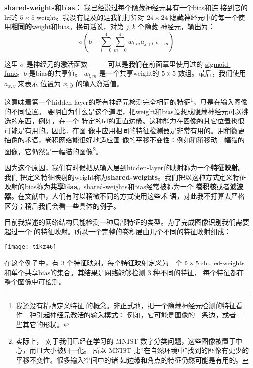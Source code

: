 \textbf{\gls*{shared-weights}和\gls*{bias}：} 我已经说过每个隐藏神经元具有一个\gls*{bias}和连
接到它的\gls*{lrf}的 $5 \times 5$ \gls*{weight}。我没有提及的是我们打算对 $24 \times 24$
隐藏神经元中的每一个使用\textbf{相同的}\gls*{weight}和\gls*{bias}。换句话说，对第 $j, k$ 个隐藏
神经元，输出为：
\begin{equation}
  \sigma\left(b + \sum_{l=0}^4 \sum_{m=0}^4  w_{l,m} a_{j+l, k+m} \right)
  \label{eq:125}\tag{125}
\end{equation}

这里 $\sigma$ 是神经元的激活函数~——~可以是我们在前面章里使用过的
\hyperref[sec:sigmoid_neurons]{\gls*{sigmoid-func}}。$b$ 是\gls*{bias}的共享值。
  $w_{l,m}$ 是一个共享\gls*{weight}的 $5 \times 5$ 数组。最后，我们使用 $a_{x, y}$ 来表示
  位置为 $x, y$ 的输入激活值。

这意味着第一个\gls*{hidden-layer}的所有神经元检测完全相同的特征\footnote{我还没有精确定义特征
  的概念。非正式地，把一个隐藏神经元检测的特征看作一种引起神经元激活的输入模式：
  例如，它可能是图像的一条边，或者一些其它的形状。}，只是在输入图像的不同位置。
要明白为什么是这个道理，把\gls*{weight}和\gls*{bias}设想成隐藏神经元可以挑选的东西，例如，在一个
特定的\gls*{lrf}的垂直边缘。这种能力在图像的其它位置也很可能是有用的。因此，在图
像中应用相同的特征检测器是非常有用的。用稍微更抽象的术语，卷积网络能很好地适应图
像的平移不变性：例如稍稍移动一幅猫的图像，它仍然是一幅猫的图像\footnote{实际上，
  对于我们已经在学习的 MNIST 数字分类问题，这些图像被置于中心，而且大小被归一化。
  所以 MNIST 比“在自然环境中”找到的图像有更少的平移不变性。很多输入空间中的诸
  如边缘和角点的特征仍然可能是有用的。}。

因为这个原因，我们有时候把从输入层到\gls*{hidden-layer}的映射称为一个\textbf{特征映射}。我们
把定义特征映射的\gls*{weight}称为\textbf{\gls*{shared-weights}}。我们把以这种方式定义特征
映射的\gls*{bias}称为\textbf{共享\gls*{bias}}。\gls*{shared-weights}和\gls*{bias}经常被称为一个%
\textbf{卷积核}或者\textbf{滤波器}。在文献中，人们有时以稍微不同的方式使用这些术
语，对此我不打算去严格区分；稍后我们会看一些具体的例子。

目前我描述的网络结构只能检测一种局部特征的类型。为了完成图像识别我们需要超过一个
的特征映射。所以一个完整的卷积层由几个不同的特征映射组成：
\begin{center}
  \texttt{[image: tikz46]}
\end{center}

在这个例子中，有 3 个特征映射。每个特征映射定义为一个 $5 \times 5$
\gls*{shared-weights}和单个共享\gls*{bias}的集合。其结果是网络能够检测 3 种不同的特征，
每个特征都在整个图像中可检测。

